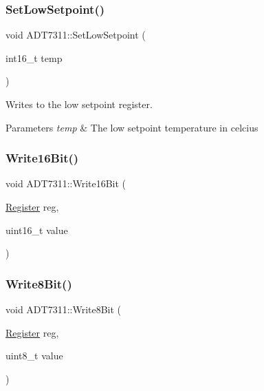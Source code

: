 \subsubsection{\texorpdfstring{Set\+Low\+Setpoint()}{SetLowSetpoint()}}
{\footnotesize\ttfamily void A\+D\+T7311\+::\+Set\+Low\+Setpoint (\begin{DoxyParamCaption}\item[{int16\+\_\+t}]{temp }\end{DoxyParamCaption})}



Writes to the low setpoint register. 


\begin{DoxyParams}{Parameters}
{\em temp} & The low setpoint temperature in celcius \\
\hline
\end{DoxyParams}
\mbox{\label{classcubesat_1_1ADT7311_a78f061f3e7a5a4f060868b53839c7af6}} 
\subsubsection{\texorpdfstring{Write16\+Bit()}{Write16Bit()}}
{\footnotesize\ttfamily void A\+D\+T7311\+::\+Write16\+Bit (\begin{DoxyParamCaption}\item[{\hyperlink{classcubesat_1_1ADT7311_a0c841a239b3da653d4304377b3e83b45}{Register}}]{reg,  }\item[{uint16\+\_\+t}]{value }\end{DoxyParamCaption})\hspace{0.3cm}{\ttfamily [private]}}

\mbox{\label{classcubesat_1_1ADT7311_acfb6dbbe3616e39449808880f96f610c}} 
\subsubsection{\texorpdfstring{Write8\+Bit()}{Write8Bit()}}
{\footnotesize\ttfamily void A\+D\+T7311\+::\+Write8\+Bit (\begin{DoxyParamCaption}\item[{\hyperlink{classcubesat_1_1ADT7311_a0c841a239b3da653d4304377b3e83b45}{Register}}]{reg,  }\item[{uint8\+\_\+t}]{value }\end{DoxyParamCaption})\hspace{0.3cm}{\ttfamily [private]}}



